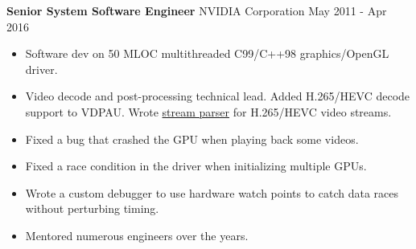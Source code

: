 \textbf{Senior System Software Engineer} NVIDIA Corporation \hfill May 2011 - Apr 2016

\begin{itemize} \itemsep -2pt

\item Software dev on 50 MLOC multithreaded C99/C++98 graphics/OpenGL driver.

\item Video decode and post-processing technical lead. Added H.265/HEVC decode
      support to VDPAU. Wrote
      \href{https://github.com/NVIDIA/vdpau-hevc-example}{stream parser}
      for H.265/HEVC video streams.

\item Fixed a bug that crashed the GPU when playing back some videos.

\item Fixed a race condition in the driver when initializing multiple GPUs.

\item Wrote a custom debugger to use hardware watch points to catch data races without
      perturbing timing.

\item Mentored numerous engineers over the years.


\end{itemize}
